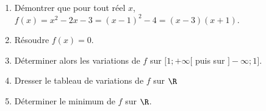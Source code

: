 
\begin{enumerate}
\item Démontrer que pour tout réel $x$, $f(x)=x^2-2x-3=(x-1)^2-4=(x-3)(x+1)$.
\item  Résoudre $f(x)= 0$.
\item  Déterminer alors les variations de $f$ sur $[1;+\infty     [$  puis sur $]-\infty;1]$.
\item  Dresser le tableau de variations de $f$ sur $\R$
\item  Déterminer le minimum de $f$ sur $\R$. 
 \end{enumerate}